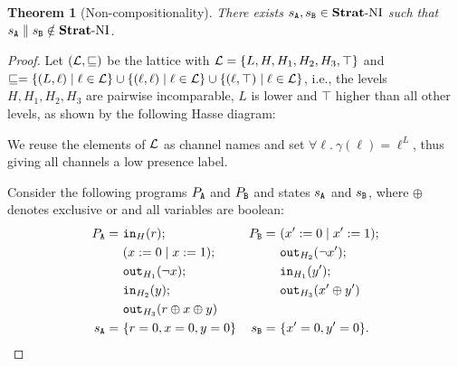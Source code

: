 \documentclass[preprint,5p,twocolumn]{elsarticle}
\newtheorem{theorem}{Theorem}
\begin{document}
\begin{theorem}[Non-compositionality]
  \label{thm:noncompositional}
  There exists $s_{\mathtt{A}}, s_{\mathtt{B}} \in \mathbf{Strat}\text{-}\mathrm{NI}$ such that $s_{\mathtt{A}} \parallel s_{\mathtt{B}} \notin \mathbf{Strat}\text{-}\mathrm{NI}$.
\end{theorem}
\begin{proof}
  Let $(\mathcal{L}, \sqsubseteq)$ be the lattice with $\mathcal{L} = \lbrace L, H, H_1, H_2, H_3, \top \rbrace$
  and $\sqsubseteq = \lbrace (L, \ell) \mid \ell \in \mathcal{L}\rbrace \cup \lbrace (\ell, \ell) \mid \ell \in \mathcal{L}\rbrace
  \cup \lbrace (\ell, \top) \mid \ell \in \mathcal{L}\rbrace$, i.e.,
  the levels $H, H_1, H_2, H_3$ are pairwise incomparable, $L$ is lower and $\top$ higher than all
  other levels, as shown by the following Hasse diagram:
  \begin{center}
  \end{center}

  We reuse the elements of $\mathcal{L}$ as channel names and set
  $\forall \ell.~\gamma(\ell) = \ell^L$, thus giving all channels a low presence label.
  
  Consider the following programs $P_{\mathtt{A}}$ and $P_{\mathtt{B}}$ and states $s_{\mathtt{A}}$ and $s_{\mathtt{B}}$, where
  $\oplus$ denotes exclusive or and all variables are boolean:
  \begin{align*}
    P_{\mathtt{A}} =~& \mathtt{in}_{H}(r); & P_{\mathtt{B}} =~ & (x' := 0 \mid x' := 1); \\
        &(x := 0 \mid x := 1); && \mathtt{out}_{H_2}(\neg x');\\
        &\mathtt{out}_{H_1}(\neg x); && \mathtt{in}_{H_1}(y'); \\
        & \mathtt{in}_{H_2}(y); && \mathtt{out}_{H_3}(x' \oplus y') \\
          & \mathtt{out}_{H_3}(r \oplus x \oplus y) \\
    s_{\mathtt{A}} =~& \lbrace r = 0, x = 0, y = 0\rbrace & s_{\mathtt{B}} =~& \lbrace x' = 0, y' = 0\rbrace.
  \end{align*}


\end{proof}
\end{document}
